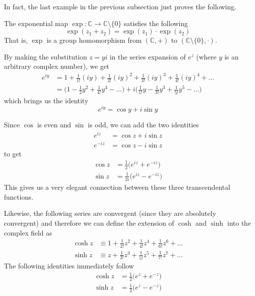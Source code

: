 \documentclass{article}
\begin{document}
    In fact, the last example in the previous subsection just proves the following. 

    \begin{lemma}
      The exponential map $\exp: \mathbb{C} \longrightarrow \mathbb{C}\setminus \{0\}$ satisfies the following
      \[\exp(z_1 + z_2) = \exp(z_1) \cdot \exp (z_2)\]
      That is, $\exp$ is a group homomorphism from $(\mathbb{C}, +)$ to $(\mathbb{C} \setminus \{0\}, \cdot)$. 
    \end{lemma}

    \begin{definition}
      By making the substitution $z = yi$ in the series expansion of $e^z$ (where $y$ is an arbitrary complex number), we get 
      \begin{align*}
          e^{iy} & = 1 + \frac{1}{1!} (iy) + \frac{1}{2!}(iy)^2 + \frac{1}{3!} (iy)^3 + \frac{1}{4!} (iy)^4 + \ldots \\
          & = \bigg(1 - \frac{1}{2} y^2 + \frac{1}{4!} y^4 - \ldots \bigg) + i \bigg(\frac{1}{1!} y - \frac{1}{3!} y^3 + \frac{1}{5!} y^5 - \ldots \bigg)
      \end{align*}
      which brings us the identity
      \[e^{iy} = \cos{y} + i \sin{y}\]
    \end{definition}

    Since $\cos$ is even and $\sin$ is odd, we can add the two identities
    \begin{align*}
        e^{iz} & = \cos{z} + i \sin{z} \\
        e^{-iz} & = \cos{z} - i \sin{z} 
    \end{align*}
    to get 
    \begin{align*}
        \cos{z} & = \frac{1}{2}\big( e^{iz} + e^{-iz} \big) \\
        \sin{z} & = \frac{1}{2i} \big( e^{iz} - e^{-iz} \big)
    \end{align*}
    This gives us a very elegant connection between these three transcendental functions. 

    \begin{definition}
      Likewise, the following series are convergent (since they are absolutely convergent) and therefore we can define the extension of $\cosh$ and $\sinh$ into the complex field as 
      \begin{align*}
          \cosh{z} & \equiv 1 + \frac{1}{2!} z^2 + \frac{1}{4!} z^4 + \frac{1}{6!} z^6 + \ldots \\
          \sinh{z} & \equiv z + \frac{1}{3!} z^3 + \frac{1}{5!} z^5 + \frac{1}{7!} z^7 + \ldots 
      \end{align*}
      The following identities immediately follow
      \begin{align*}
          \cosh{z} & = \frac{1}{2} \big( e^z + e^{-z} \big) \\
          \sinh{z} & = \frac{1}{2} \big( e^{z} - e^{-z}\big) 
      \end{align*}
    \end{definition}
\end{document}
